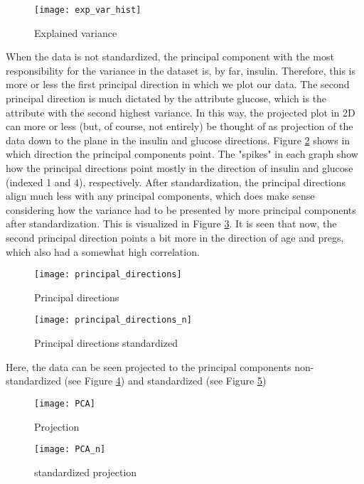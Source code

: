\begin{figure}
  \centering{}
  \texttt{[image: exp\_var\_hist]}
  \caption{Explained variance}\label{fig:exp_var_hist}
\end{figure}

When the data is not standardized, the principal component with the most
responsibility for the variance in the dataset is, by far, insulin. Therefore,
this is more or less the first principal direction in which we plot our data. The second
principal direction is much dictated by the attribute glucose, which is the
attribute with the second highest variance. In this way, the projected plot in
2D can more or less (but, of course, not entirely) be thought of as
projection of the data down to the plane in the insulin and glucose directions.
Figure \ref{fig:principal_directions} shows in which direction the principal components point. The "spikes"
in each graph show how the principal directions point mostly in the direction of
insulin and glucose (indexed 1 and 4), respectively. After standardization, the principal
directions align much less with any principal components, which does make sense
considering how the variance had to be presented by more principal components
after standardization. This is visualized in Figure \ref{fig:principal_directions_n}.
It is seen that now, the second principal direction points a bit more in the direction
of age and pregs, which also had a somewhat high correlation.

\begin{figure}
  \centering{}
  \texttt{[image: principal\_directions]}
  \caption{Principal directions}\label{fig:principal_directions}
\end{figure}

\begin{figure}
  \centering{}
  \texttt{[image: principal\_directions\_n]}
  \caption{Principal directions standardized}\label{fig:principal_directions_n}
\end{figure}

Here, the data can be seen projected to the principal components non-standardized
(see Figure \ref{fig:PCA})
and standardized (see Figure \ref{fig:PCA_n})

\begin{figure}
  \centering{}
  \texttt{[image: PCA]}
  \caption{Projection}\label{fig:PCA}
\end{figure}

\begin{figure}
  \centering{}
  \texttt{[image: PCA\_n]}
  \caption{standardized projection}\label{fig:PCA_n}
\end{figure}

